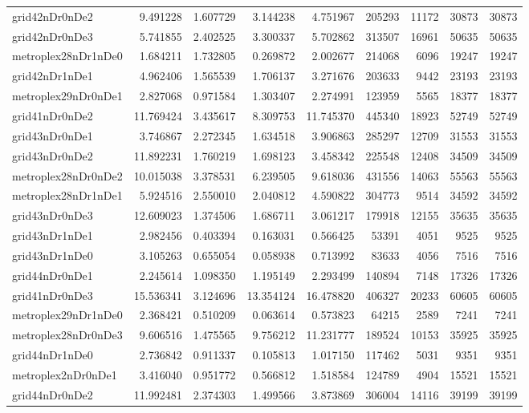 \begin{longtable}{|l|r|r|r|r|r|r|r|r|}
grid42nDr0nDe2 & 9.491228 & 1.607729 & 3.144238 & 4.751967 & 205293 & 11172 & 30873 & 30873 \\
grid42nDr0nDe3 & 5.741855 & 2.402525 & 3.300337 & 5.702862 & 313507 & 16961 & 50635 & 50635 \\
metroplex28nDr1nDe0 & 1.684211 & 1.732805 & 0.269872 & 2.002677 & 214068 & 6096 & 19247 & 19247 \\
grid42nDr1nDe1 & 4.962406 & 1.565539 & 1.706137 & 3.271676 & 203633 & 9442 & 23193 & 23193 \\
metroplex29nDr0nDe1 & 2.827068 & 0.971584 & 1.303407 & 2.274991 & 123959 & 5565 & 18377 & 18377 \\
grid41nDr0nDe2 & 11.769424 & 3.435617 & 8.309753 & 11.745370 & 445340 & 18923 & 52749 & 52749 \\
grid43nDr0nDe1 & 3.746867 & 2.272345 & 1.634518 & 3.906863 & 285297 & 12709 & 31553 & 31553 \\
grid43nDr0nDe2 & 11.892231 & 1.760219 & 1.698123 & 3.458342 & 225548 & 12408 & 34509 & 34509 \\
metroplex28nDr0nDe2 & 10.015038 & 3.378531 & 6.239505 & 9.618036 & 431556 & 14063 & 55563 & 55563 \\
metroplex28nDr1nDe1 & 5.924516 & 2.550010 & 2.040812 & 4.590822 & 304773 & 9514 & 34592 & 34592 \\
grid43nDr0nDe3 & 12.609023 & 1.374506 & 1.686711 & 3.061217 & 179918 & 12155 & 35635 & 35635 \\
grid43nDr1nDe1 & 2.982456 & 0.403394 & 0.163031 & 0.566425 & 53391 & 4051 & 9525 & 9525 \\
grid43nDr1nDe0 & 3.105263 & 0.655054 & 0.058938 & 0.713992 & 83633 & 4056 & 7516 & 7516 \\
grid44nDr0nDe1 & 2.245614 & 1.098350 & 1.195149 & 2.293499 & 140894 & 7148 & 17326 & 17326 \\
grid41nDr0nDe3 & 15.536341 & 3.124696 & 13.354124 & 16.478820 & 406327 & 20233 & 60605 & 60605 \\
metroplex29nDr1nDe0 & 2.368421 & 0.510209 & 0.063614 & 0.573823 & 64215 & 2589 & 7241 & 7241 \\
metroplex28nDr0nDe3 & 9.606516 & 1.475565 & 9.756212 & 11.231777 & 189524 & 10153 & 35925 & 35925 \\
grid44nDr1nDe0 & 2.736842 & 0.911337 & 0.105813 & 1.017150 & 117462 & 5031 & 9351 & 9351 \\
metroplex2nDr0nDe1 & 3.416040 & 0.951772 & 0.566812 & 1.518584 & 124789 & 4904 & 15521 & 15521 \\
grid44nDr0nDe2 & 11.992481 & 2.374303 & 1.499566 & 3.873869 & 306004 & 14116 & 39199 & 39199 \\

\end{longtable}
